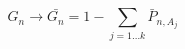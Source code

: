 \begin{equation}
    G_n \xrightarrow{}    \bar{G_n} = 1 - \sum_{j=1 \dotsc k} \bar{P}_{n,A_j}
\end{equation}


